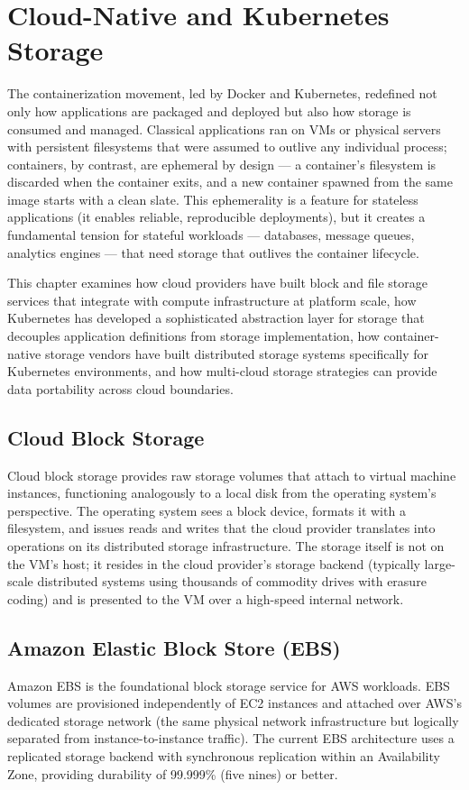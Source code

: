 \chapter{Cloud-Native and Kubernetes Storage}
\label{ch:15}

The containerization movement, led by Docker and Kubernetes, redefined not only how applications are packaged and deployed but also how storage is consumed and managed. Classical applications ran on VMs or physical servers with persistent filesystems that were assumed to outlive any individual process; containers, by contrast, are ephemeral by design --- a container's filesystem is discarded when the container exits, and a new container spawned from the same image starts with a clean slate. This ephemerality is a feature for stateless applications (it enables reliable, reproducible deployments), but it creates a fundamental tension for stateful workloads --- databases, message queues, analytics engines --- that need storage that outlives the container lifecycle.

This chapter examines how cloud providers have built block and file storage services that integrate with compute infrastructure at platform scale, how Kubernetes has developed a sophisticated abstraction layer for storage that decouples application definitions from storage implementation, how container-native storage vendors have built distributed storage systems specifically for Kubernetes environments, and how multi-cloud storage strategies can provide data portability across cloud boundaries.

\section{Cloud Block Storage}
Cloud block storage provides raw storage volumes that attach to virtual machine instances, functioning analogously to a local disk from the operating system's perspective. The operating system sees a block device, formats it with a filesystem, and issues reads and writes that the cloud provider translates into operations on its distributed storage infrastructure. The storage itself is not on the VM's host; it resides in the cloud provider's storage backend (typically large-scale distributed systems using thousands of commodity drives with erasure coding) and is presented to the VM over a high-speed internal network.

\section{Amazon Elastic Block Store (EBS)}
Amazon EBS is the foundational block storage service for AWS workloads. EBS volumes are provisioned independently of EC2 instances and attached over AWS's dedicated storage network (the same physical network infrastructure but logically separated from instance-to-instance traffic). The current EBS architecture uses a replicated storage backend with synchronous replication within an Availability Zone, providing durability of 99.999\% (five nines) or better.

